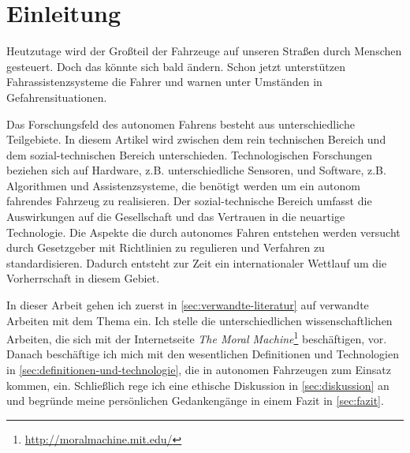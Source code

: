 \section{Einleitung}

Heutzutage wird der Großteil der Fahrzeuge auf unseren Straßen durch Menschen gesteuert. Doch das könnte sich bald ändern. Schon jetzt unterstützen Fahrassistenzsysteme die Fahrer und warnen unter Umständen in Gefahrensituationen.

Das Forschungsfeld des autonomen Fahrens besteht aus unterschiedliche Teilgebiete. In diesem Artikel wird  zwischen dem rein technischen Bereich und dem sozial-technischen Bereich unterschieden. Technologischen Forschungen beziehen sich auf Hardware, z.B. unterschiedliche Sensoren, und Software, z.B. Algorithmen und Assistenzsysteme, die benötigt werden um ein autonom fahrendes Fahrzeug zu realisieren. Der sozial-technische Bereich umfasst die Auswirkungen auf die Gesellschaft und das Vertrauen in die neuartige Technologie. Die Aspekte die durch autonomes Fahren entstehen werden versucht durch Gesetzgeber mit Richtlinien zu regulieren und Verfahren zu standardisieren. Dadurch entsteht zur Zeit ein internationaler Wettlauf um die Vorherrschaft in diesem Gebiet.

In dieser Arbeit gehen ich zuerst in \ref{sec:verwandte-literatur} auf  verwandte Arbeiten mit dem Thema ein. Ich stelle die unterschiedlichen wissenschaftlichen Arbeiten, die sich mit der Internetseite \textit{The Moral Machine}\footnote{\url{http://moralmachine.mit.edu/}} beschäftigen, vor. Danach beschäftige ich mich mit den wesentlichen Definitionen und Technologien in \ref{sec:definitionen-und-technologie}, die in autonomen Fahrzeugen zum Einsatz kommen, ein. Schließlich rege ich eine ethische Diskussion in \ref{sec:diskussion} an und begründe meine persönlichen Gedankengänge in einem Fazit in \ref{sec:fazit}.